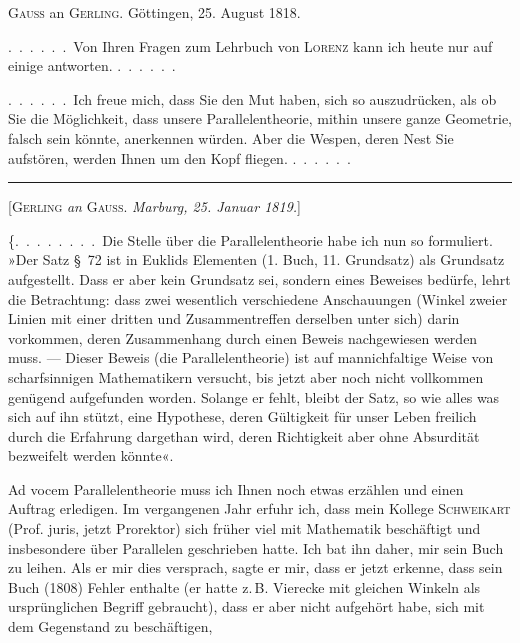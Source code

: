 \clearpage{}
\begin{center}\textsc{Gauss} an \textsc{Gerling}. Göttingen, 25. August 1818.\end{center}

.\ .\ .\ .\ .\ .\ Von Ihren Fragen zum Lehrbuch von \textsc{Lorenz} kann ich
heute nur auf einige antworten. .\ .\ .\ .\ .\ .

.\ .\ .\ .\ .\ .\ Ich freue mich, dass Sie den Mut haben, sich so auszudrücken, als
ob Sie die Möglichkeit, dass unsere Parallelentheorie, mithin unsere ganze
Geometrie, falsch sein könnte, anerkennen würden. Aber die Wespen, deren Nest Sie
aufstören, werden Ihnen um den Kopf fliegen. .\ .\ .\ .\ .\ .

\begin{center}\rule{3cm}{0.4pt}\end{center}

\begin{center}[\textsc{Gerling} \emph{an} \textsc{Gauss}. \emph{Marburg, 25. Januar 1819.}]\end{center}

\{.\ .\ .\ .\ .\ .\ .\ .\ Die Stelle über die Parallelentheorie habe ich nun so formuliert.
»Der Satz \S\ 72 ist in Euklids Elementen (1. Buch, 11. Grundsatz) als
Grundsatz aufgestellt. Dass er aber kein Grundsatz sei, sondern eines
Beweises bedürfe, lehrt die Betrachtung: dass zwei wesentlich verschiedene
Anschauungen (Winkel zweier Linien mit einer dritten und Zusammentreffen
derselben unter sich) darin vorkommen, deren  Zusammenhang durch
einen Beweis nachgewiesen werden muss. --- Dieser Beweis (die
Parallelentheorie) ist auf mannichfaltige Weise von scharfsinnigen
Mathematikern versucht, bis jetzt aber noch nicht vollkommen genügend
aufgefunden worden. Solange er fehlt, bleibt der Satz, so wie alles was sich
auf ihn stützt, eine Hypothese, deren Gültigkeit für unser Leben freilich
durch die Erfahrung dargethan wird, deren 
Richtigkeit aber ohne Absurdität bezweifelt werden könnte«.

Ad vocem Parallelentheorie muss ich Ihnen noch etwas erzählen und einen
Auftrag erledigen. Im vergangenen Jahr erfuhr ich, dass mein Kollege
\textsc{Schweikart} (Prof. juris, jetzt Prorektor) sich früher viel mit
Mathematik beschäftigt und insbesondere über Parallelen geschrieben
hatte. Ich bat ihn daher, mir sein Buch zu leihen. Als er mir dies
versprach, sagte er mir, dass er jetzt erkenne, dass sein Buch
(1808) Fehler enthalte (er hatte z.\,B. Vierecke mit gleichen Winkeln als
ursprünglichen Begriff gebraucht), dass er aber nicht aufgehört habe,
sich mit dem Gegenstand zu beschäftigen,
